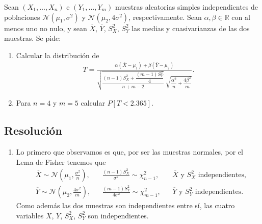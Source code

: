 \documentclass[12pt]{article}
\newcommand{\N}{\mathcal{N}}
\newcommand{\R}{\mathbb{R}}
\renewcommand{\P}{{P}}
\begin{document}
    \portada[%
        titulo=Inferencia Estadística,
        subtitulo=Entrega Ejercicio Tema 2,
        autor=Jesús Muñoz Velasco,
        año=Curso 2026-2027]
        
    \begin{ejercicio}
        Sean $(X_1,\dots,X_n)$ e $(Y_1,\dots,Y_m)$ muestras aleatorias simples independientes de poblaciones $\N(\mu_1,\sigma^2)$ y $\N(\mu_2,4\sigma^2)$, respectivamente. Sean $\alpha,\beta\in\R$ con al menos uno no nulo, y sean $\overline{X}$, $\overline{Y}$, $S_X^2$, $S_Y^2$ las medias y cuasivarianzas de las dos muestras. Se pide:
    
        \begin{enumerate}[label=\alph*)]
            \item Calcular la distribución de
            \begin{gather*}
                T=\frac{\alpha(\overline{X}-\mu_1)+\beta(\overline{Y}-\mu_2)}{\sqrt{\dfrac{(n-1)S_X^2+\dfrac{(m-1)S_Y^2}{4}}{n+m-2}}\;\sqrt{\dfrac{\alpha^2}{n}+\dfrac{4\beta^2}{m}}}.
            \end{gather*}
            \item Para $n=4$ y $m=5$ calcular $\P[T < 2.365]$.
        \end{enumerate}
        \vspace{1cm}
        \subsection*{Resolución}

        \begin{enumerate}[label=\alph*)]
            \item Lo primero que observamos es que, por ser las muestras normales, por el Lema de Fisher tenemos que
            \begin{align*}
                &\overline{X}\sim\N\!\left(\mu_1,\frac{\sigma^2}{n}\right), &&\frac{(n-1)S_X^2}{\sigma^2}\sim\chi^2_{n-1}, &&\overline{X}\text{ y }S_X^2\text{ independientes},\\[2pt]
                &\overline{Y}\sim\N\!\left(\mu_2,\frac{4\sigma^2}{m}\right), &&\frac{(m-1)S_Y^2}{4\sigma^2}\sim\chi^2_{m-1}, &&\overline{Y}\text{ y }S_Y^2\text{ independientes}.
            \end{align*}
            Como además las dos muestras son independientes entre sí, las cuatro variables $\overline{X}$, $\overline{Y}$, $S_X^2$, $S_Y^2$ son independientes.\\


\end{enumerate}
\end{ejercicio}
\end{document}
